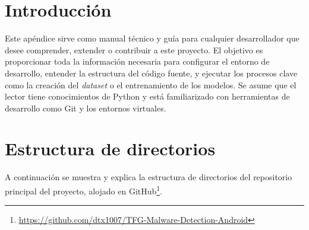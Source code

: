 \label{apendice:documentacion_tecnica}

\section{Introducción}
Este apéndice sirve como manual técnico y guía para cualquier desarrollador que desee comprender, extender o contribuir a este proyecto. El objetivo es proporcionar toda la información necesaria para configurar el entorno de desarrollo, entender la estructura del código fuente, y ejecutar los procesos clave como la creación del \textit{dataset} o el entrenamiento de los modelos. Se asume que el lector tiene conocimientos de Python y está familiarizado con herramientas de desarrollo como Git y los entornos virtuales.

\section{Estructura de directorios}
A continuación se muestra y explica la estructura de directorios del repositorio principal del proyecto, alojado en GitHub\footnote{\url{https://github.com/dtx1007/TFG-Malware-Detection-Android}}.

